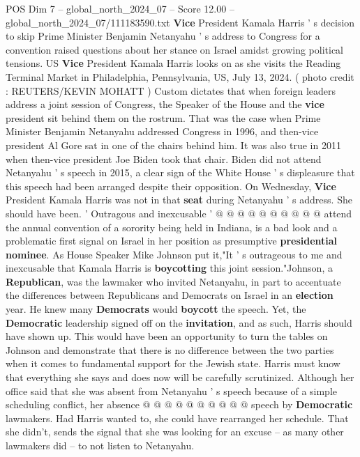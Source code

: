 \begin{textsample}{POS Dim 7 – global\_north\_2024\_07 – Score 12.00 – global\_north\_2024\_07/111183590.txt}  \label{ex:f7_pos_047}
\textbf{Vice} President Kamala Harris ' s decision to skip Prime Minister Benjamin Netanyahu ' s address to Congress for a convention raised questions about her stance on Israel amidst growing political tensions.
US \textbf{Vice} President Kamala Harris looks on as she visits the Reading Terminal Market in Philadelphia, Pennsylvania, US, July 13, 2024. ( photo credit : REUTERS/KEVIN MOHATT ) Custom dictates that when foreign leaders address a joint session of Congress, the Speaker of the House and the \textbf{vice} president sit behind them on the rostrum.
That was the case when Prime Minister Benjamin Netanyahu addressed Congress in 1996, and then-vice president Al Gore sat in one of the chairs behind him.
It was also true in 2011 when then-vice president Joe Biden took that chair.
Biden did not attend Netanyahu ' s speech in 2015, a clear sign of the White House ' s displeasure that this speech had been arranged despite their opposition.
On Wednesday, \textbf{Vice} President Kamala Harris was not in that \textbf{seat} during Netanyahu ' s address.
She should have been. ' Outragous and inexcusable ' @ @ @ @ @ @ @ @ @ @ attend the annual convention of a sorority being held in Indiana, is a bad look and a problematic first signal on Israel in her position as presumptive \textbf{presidential} \textbf{nominee}.
As House Speaker Mike Johnson put it,"It ' s outrageous to me and inexcusable that Kamala Harris is \textbf{boycotting} this joint session."Johnson, a \textbf{Republican}, was the lawmaker who invited Netanyahu, in part to accentuate the differences between Republicans and Democrats on Israel in an \textbf{election} year.
He knew many \textbf{Democrats} would \textbf{boycott} the speech.
Yet, the \textbf{Democratic} leadership signed off on the \textbf{invitation}, and as such, Harris should have shown up.
This would have been an opportunity to turn the tables on Johnson and demonstrate that there is no difference between the two parties when it comes to fundamental support for the Jewish state.
Harris must know that everything she says and does now will be carefully scrutinized.
Although her office said that she was absent from Netanyahu ' s speech because of a simple scheduling conflict, her absence @ @ @ @ @ @ @ @ @ @ speech by \textbf{Democratic} lawmakers.
Had Harris wanted to, she could have rearranged her schedule.
That she didn't, sends the signal that she was looking for an excuse -- as many other lawmakers did -- to not listen to Netanyahu.

\end{textsample}
